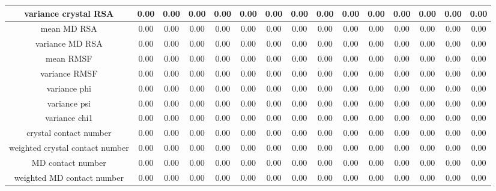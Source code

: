\begin{table}[htbp]
\begin{center}
\begin{tabular}{|c|c|c|c|c|c|c|c|c|c|c|c|c|c|c|}
variance crystal RSA          		& 0.00 &	0.00 &	0.00 &	0.00 &	0.00 &	0.00 &	0.00 &	0.00 &	0.00 & 0.00 & 0.00 & 0.00 & 0.00 & 0.00 \\
\hline
mean MD RSA          				& 0.00 &	0.00 &	0.00 &	0.00 &	0.00 &	0.00 &	0.00 &	0.00 &	0.00 & 0.00 & 0.00 & 0.00 & 0.00 & 0.00 \\
\hline
variance MD RSA          			& 0.00 &	0.00 &	0.00 &	0.00 &	0.00 &	0.00 &	0.00 &	0.00 &	0.00 & 0.00 & 0.00 & 0.00 & 0.00 & 0.00 \\
\hline
mean RMSF          	 				& 0.00 &	0.00 &	0.00 &	0.00 &	0.00 &	0.00 &	0.00 &	0.00 &	0.00 & 0.00 & 0.00 & 0.00 & 0.00 & 0.00 \\
\hline
variance RMSF						& 0.00 &	0.00 &	0.00 &	0.00 &	0.00 &	0.00 &	0.00 &	0.00 &	0.00 & 0.00 & 0.00 & 0.00 & 0.00 & 0.00 \\
\hline
variance phi						& 0.00 &	0.00 &	0.00 &	0.00 &	0.00 &	0.00 &	0.00 &	0.00 &	0.00 & 0.00 & 0.00 & 0.00 & 0.00 & 0.00 \\
\hline
variance psi						& 0.00 &	0.00 &	0.00 &	0.00 &	0.00 &	0.00 &	0.00 &	0.00 &	0.00 & 0.00 & 0.00 & 0.00 & 0.00 & 0.00 \\
\hline
variance chi1						& 0.00 &	0.00 &	0.00 &	0.00 &	0.00 &	0.00 &	0.00 &	0.00 &	0.00 & 0.00 & 0.00 & 0.00 & 0.00 & 0.00 \\
\hline
crystal contact number				& 0.00 &	0.00 &	0.00 &	0.00 &	0.00 &	0.00 &	0.00 &	0.00 &	0.00 & 0.00 & 0.00 & 0.00 & 0.00 & 0.00 \\
\hline
weighted crystal contact number		& 0.00 &	0.00 &	0.00 &	0.00 &	0.00 &	0.00 &	0.00 &	0.00 &	0.00 & 0.00 & 0.00 & 0.00 & 0.00 & 0.00 \\
\hline
MD contact number					& 0.00 &	0.00 &	0.00 &	0.00 &	0.00 &	0.00 &	0.00 &	0.00 &	0.00 & 0.00 & 0.00 & 0.00 & 0.00 & 0.00 \\
\hline
weighted MD contact number			& 0.00 &	0.00 &	0.00 &	0.00 &	0.00 &	0.00 &	0.00 &	0.00 &	0.00 & 0.00 & 0.00 & 0.00 & 0.00 & 0.00 \\
\hline
\end{tabular}
\end{center}
\end{table}
